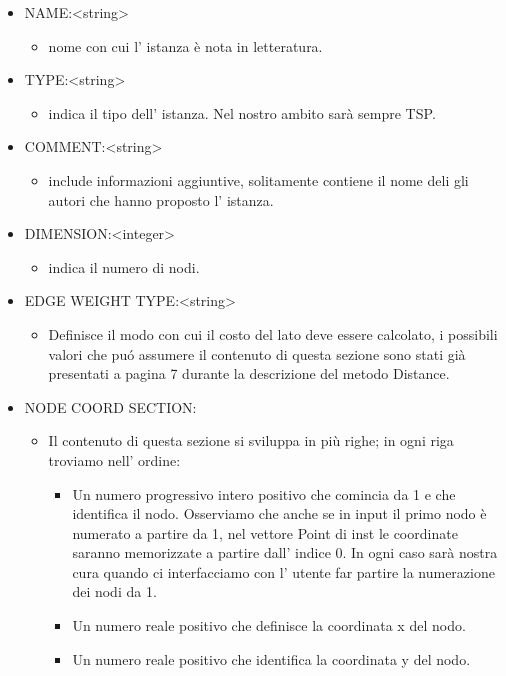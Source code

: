 \documentclass[11pt]{article}
\begin{document}
\begin{itemize}
	\item NAME:<string> 
	\begin{itemize}
	\item nome con cui l' istanza \`e nota in letteratura.
	\end{itemize}
	\item TYPE:<string>
	
	\begin{itemize}	 
	\item indica il tipo dell' istanza. Nel nostro ambito sar\`a sempre TSP.    
    \end{itemize}	
	 
	\item COMMENT:<string> 
	\begin{itemize}	
	\item include informazioni aggiuntive, solitamente contiene il nome deli gli autori che hanno proposto l'  				istanza.
	\end{itemize}	
	
		
	\item DIMENSION:<integer> 
	\begin{itemize}
	\item indica il numero di nodi.
	\end{itemize}	
	
	\item EDGE WEIGHT TYPE:<string>
	\begin{itemize} 
	\item Definisce il modo con cui il costo del lato deve essere calcolato, i possibili valori  che pu\'o assumere    		     il contenuto di questa sezione sono stati gi\`a presentati a pagina 7 durante la descrizione del metodo Distance.
	\end{itemize}	
	
	\item NODE COORD SECTION: 
	\begin{itemize}	
	
	\item Il contenuto di questa sezione si sviluppa in pi\`u righe; in ogni riga troviamo nell' ordine:
	\begin{itemize}
	\item Un numero progressivo intero positivo che comincia da 1 e che identifica il nodo. Osserviamo che anche se in input il       
	primo nodo \`e numerato a partire da 1, nel vettore Point di inst le coordinate saranno memorizzate a partire dall' indice 0. 		In ogni caso sar\`a nostra cura quando ci interfacciamo con l' utente far partire la numerazione dei nodi da 1.
	\item Un numero reale positivo che definisce la coordinata x del nodo.
	\item Un numero reale positivo che identifica la coordinata y del nodo.
	\end{itemize}		
	\end{itemize}	
\end{itemize}
\end{document}
